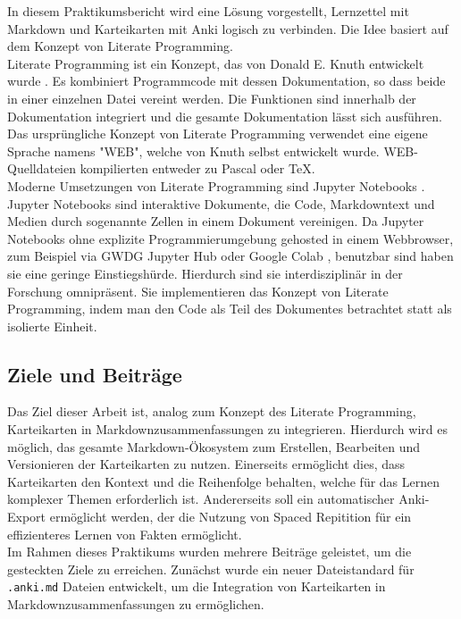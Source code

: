 \documentclass[ngerman]{article}
\begin{document}
\newpage

In diesem Praktikumsbericht wird eine Lösung vorgestellt, Lernzettel mit Markdown und Karteikarten mit Anki logisch zu verbinden. Die Idee basiert auf dem Konzept von Literate Programming.\\

Literate Programming ist ein Konzept, das von Donald E. Knuth entwickelt wurde \cite{LitProg}. Es kombiniert Programmcode mit dessen Dokumentation, so dass beide in einer einzelnen Datei vereint werden. Die Funktionen sind innerhalb der Dokumentation integriert und die gesamte Dokumentation lässt sich ausführen. Das ursprüngliche Konzept von Literate Programming verwendet eine eigene Sprache namens "WEB", welche von Knuth selbst entwickelt wurde. WEB-Quelldateien kompilierten entweder zu Pascal oder \TeX \cite{WebIntroduction}.\\

Moderne Umsetzungen von Literate Programming sind Jupyter Notebooks \cite{Jupyter}. Jupyter Notebooks sind interaktive Dokumente, die Code, Markdowntext und Medien durch sogenannte Zellen in einem Dokument vereinigen. Da Jupyter Notebooks ohne explizite Programmierumgebung gehosted in einem Webbrowser, zum Beispiel via GWDG Jupyter Hub \cite{JupyterGWDG} oder Google Colab \cite{Colab}, benutzbar sind haben sie eine geringe Einstiegshürde. Hierdurch sind sie interdisziplinär in der Forschung omnipräsent. Sie implementieren das Konzept von Literate Programming, indem man den Code als Teil des Dokumentes betrachtet statt als isolierte Einheit.

\subsection{Ziele und Beitr\"age}
Das Ziel dieser Arbeit ist, analog zum Konzept des Literate Programming, Karteikarten in Markdownzusammenfassungen zu integrieren. Hierdurch wird es möglich, das gesamte Markdown-Ökosystem zum Erstellen, Bearbeiten und Versionieren der Karteikarten zu nutzen. Einerseits ermöglicht dies, dass Karteikarten den Kontext und die Reihenfolge behalten, welche für das Lernen komplexer Themen erforderlich ist. Andererseits soll ein automatischer Anki-Export ermöglicht werden, der die Nutzung von Spaced Repitition für ein effizienteres Lernen von Fakten ermöglicht.\\

Im Rahmen dieses Praktikums wurden mehrere Beiträge geleistet, um die gesteckten Ziele zu erreichen. Zunächst wurde ein neuer Dateistandard für \texttt{.anki.md} Dateien entwickelt, um die Integration von Karteikarten in Markdownzusammenfassungen zu ermöglichen.
\end{document}
